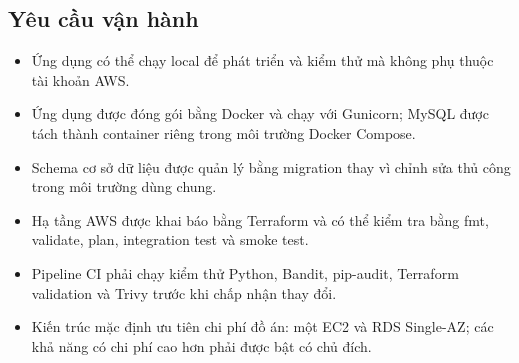 \subsection{Yêu cầu vận hành}

\begin{itemize}
    \item Ứng dụng có thể chạy local để phát triển
    và kiểm thử mà không phụ thuộc tài khoản AWS.

    \item Ứng dụng được đóng gói bằng Docker và chạy
    với Gunicorn; MySQL được tách thành container riêng
    trong môi trường Docker Compose.

    \item Schema cơ sở dữ liệu được quản lý bằng
    migration thay vì chỉnh sửa thủ công trong
    môi trường dùng chung.

    \item Hạ tầng AWS được khai báo bằng Terraform
    và có thể kiểm tra bằng fmt, validate, plan,
    integration test và smoke test.

    \item Pipeline CI phải chạy kiểm thử Python,
    Bandit, pip-audit, Terraform validation và Trivy
    trước khi chấp nhận thay đổi.

    \item Kiến trúc mặc định ưu tiên chi phí đồ án:
    một EC2 và RDS Single-AZ; các khả năng có chi phí
    cao hơn phải được bật có chủ đích.
\end{itemize}
